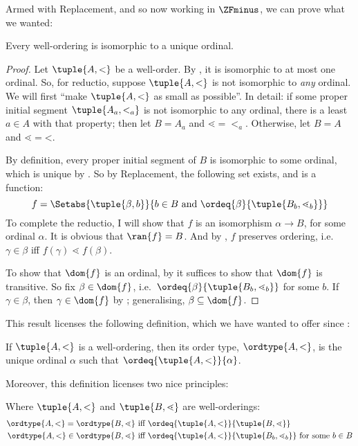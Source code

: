 \documentclass[../../../include/open-logic-section]{subfiles}
\begin{document}
Armed with Replacement, and so now working in $\ZFminus$, we can prove what we wanted:
\begin{thm}
	Every well-ordering is isomorphic to a unique ordinal. 
\end{thm}
\begin{proof}
	Let $\tuple{A, <}$ be a well-order. By , it is isomorphic to at most one ordinal. So, for reductio, suppose $\tuple{A, <}$ is not isomorphic to \emph{any} ordinal. We will first ``make $\tuple{A, <}$ as small as possible''. In detail: if some proper initial segment  $\tuple{A_a, <_a}$ is not isomorphic to any ordinal, there is a least $a \in A$ with that property; then let $B = A_a$ and $\mathord{\lessdot} = \mathord{<_a}$. Otherwise, let $B = A$ and $\mathord{\lessdot} = \mathord{<}$. 
	
	By definition, every proper initial segment of $B$ is isomorphic to some ordinal, which is unique by . So by Replacement, the following set exists, and is a function:
		$$f = \Setabs{\tuple{\beta, b}}{b \in B\text{ and }\ordeq{\beta}{\tuple{B_b, \lessdot_b}}}$$
	To complete the reductio, I will show that $f$ is an isomorphism $\alpha \to B$, for some ordinal $\alpha$. It is obvious that $\ran{f} = B$. And by , $f$ preserves ordering, i.e.\ $\gamma \in \beta$ iff $f(\gamma) \lessdot f(\beta)$. 
	
	To show that $\dom{f}$ is an ordinal, by  it suffices to show that $\dom{f}$ is transitive. So fix $\beta \in \dom{f}$, i.e.\ $\ordeq{\beta}{\tuple{B_b, \lessdot_b}}$ for some $b$. If $\gamma \in \beta$, then $\gamma \in \dom{f}$ by ; generalising, $\beta \subseteq \dom{f}$. 
\end{proof}\noindent
This result licenses the following definition, which we have wanted to offer since :
\begin{defn}
	If $\tuple{A, <}$ is a well-ordering, then its order type, $\ordtype{A, <}$, is the unique ordinal $\alpha$ such that $\ordeq{\tuple{A, < }}{\alpha}$. 
\end{defn}\noindent
Moreover, this definition licenses two nice principles:
\begin{cor}
	Where $\tuple{A, <}$ and $\tuple{B, \lessdot}$ are well-orderings: 
	\begin{align*}
		\ordtype{A, <} = \ordtype{B, \lessdot}&\text{ iff }\ordeq{\tuple{A, <}}{\tuple{B, \lessdot}}\\
		\ordtype{A, <} \in \ordtype{B, \lessdot}&\text{ iff }\ordeq{\tuple{A, <}}{\tuple{B_b, \lessdot_b}}\text{ for some }b \in B
\end{align*}
\end{cor}
\end{document}
